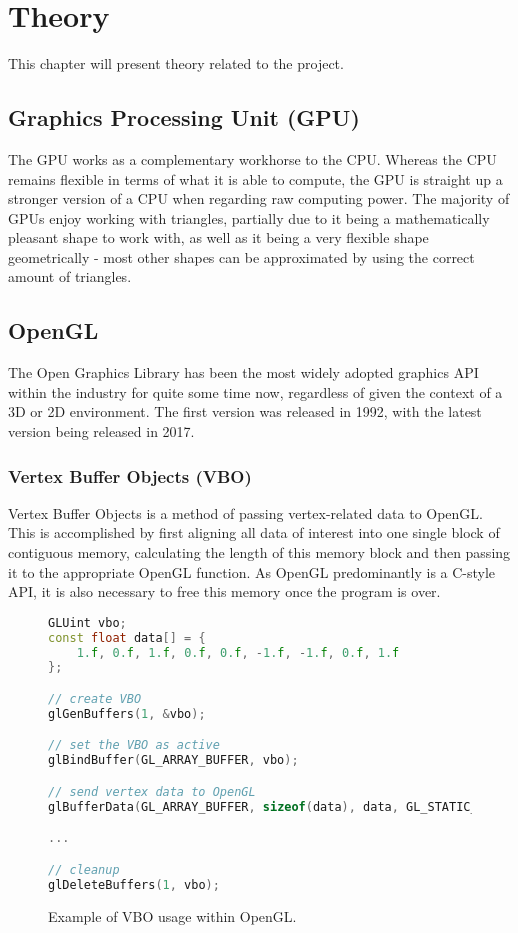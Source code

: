 \section{Theory}
\label{ch:theory}
\noindent
This chapter will present theory related to the project.

\subsection{Graphics Processing Unit (GPU)}

The GPU works as a complementary workhorse to the CPU. Whereas the CPU remains flexible in terms of what it is able to compute, the GPU is straight up a stronger version of a CPU when regarding raw computing power. The majority of GPUs enjoy working with triangles, partially due to it being a mathematically pleasant shape to work with, as well as it being a very flexible shape geometrically - most other shapes can be approximated by using the correct amount of triangles.\cite{gpu}

\subsection{OpenGL}

The Open Graphics Library has been the most widely adopted graphics API within the industry for quite some time now, regardless of given the context of a 3D or 2D environment. The first version was released in 1992, with the latest version being released in 2017.\cite{opengl}

\subsubsection{Vertex Buffer Objects (VBO)}

Vertex Buffer Objects is a method of passing vertex-related data to OpenGL. This is accomplished by first aligning all data of interest into one single block of contiguous memory, calculating the length of this memory block and then passing it to the appropriate OpenGL function. As OpenGL predominantly is a C-style API, it is also necessary to free this memory once the program is over.

\begin{figure}[H]
	\begin{center}
	\begin{lstlisting}[language=C++]
GLUint vbo;
const float data[] = {
	1.f, 0.f, 1.f, 0.f, 0.f, -1.f, -1.f, 0.f, 1.f
};

// create VBO
glGenBuffers(1, &vbo);

// set the VBO as active
glBindBuffer(GL_ARRAY_BUFFER, vbo);

// send vertex data to OpenGL
glBufferData(GL_ARRAY_BUFFER, sizeof(data), data, GL_STATIC_DRAW);

...

// cleanup
glDeleteBuffers(1, vbo);
	\end{lstlisting}
		\caption{Example of VBO usage within OpenGL.}
	\end{center}
\end{figure}


